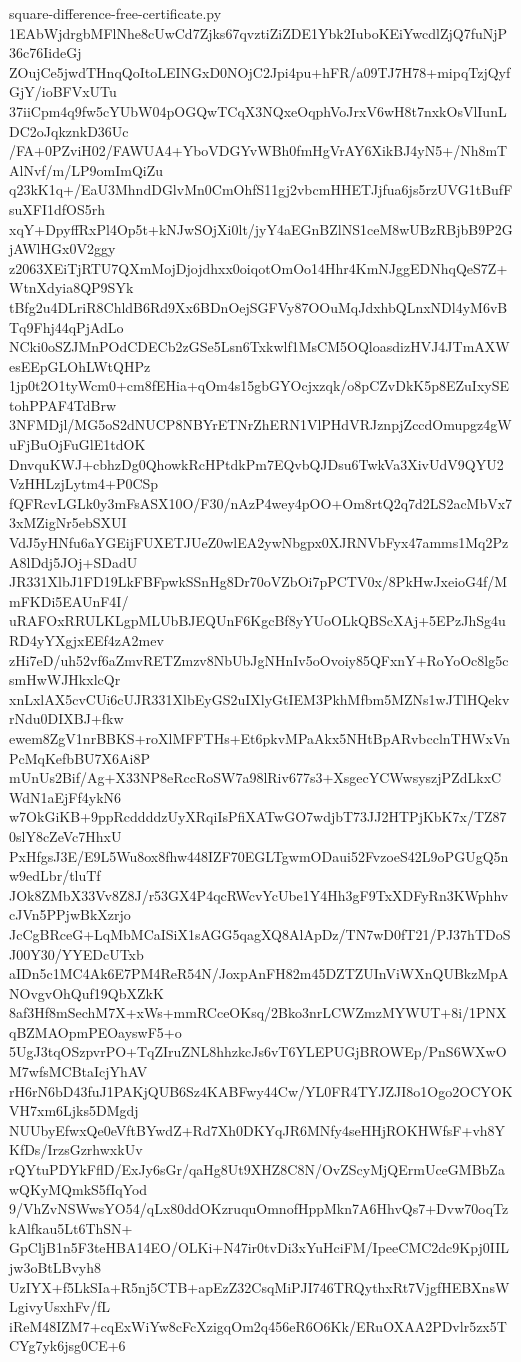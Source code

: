 \documentclass[11pt]{article}
\theoremstyle{definition}
\theoremstyle{remark}
\begin{document}
\begin{filecontents*}[overwrite]{square-difference-free-certificate.py}
1EAbWjdrgbMFlNhe8cUwCd7Zjks67qvztiZiZDE1Ybk2IuboKEiYwcdlZjQ7fuNjP36c76IideGj
ZOujCe5jwdTHnqQoItoLEINGxD0NOjC2Jpi4pu+hFR/a09TJ7H78+mipqTzjQyfGjY/ioBFVxUTu
37iiCpm4q9fw5cYUbW04pOGQwTCqX3NQxeOqphVoJrxV6wH8t7nxkOsVlIunLDC2oJqkznkD36Uc
/FA+0PZviH02/FAWUA4+YboVDGYvWBh0fmHgVrAY6XikBJ4yN5+/Nh8mTAlNvf/m/LP9omImQiZu
q23kK1q+/EaU3MhndDGlvMn0CmOhfS11gj2vbcmHHETJjfua6js5rzUVG1tBufFsuXFI1dfOS5rh
xqY+DpyffRxPl4Op5t+kNJwSOjXi0lt/jyY4aEGnBZlNS1ceM8wUBzRBjbB9P2GjAWlHGx0V2ggy
z2063XEiTjRTU7QXmMojDjojdhxx0oiqotOmOo14Hhr4KmNJggEDNhqQeS7Z+WtnXdyia8QP9SYk
tBfg2u4DLriR8ChldB6Rd9Xx6BDnOejSGFVy87OOuMqJdxhbQLnxNDl4yM6vBTq9Fhj44qPjAdLo
NCki0oSZJMnPOdCDECb2zGSe5Lsn6Txkwlf1MsCM5OQloasdizHVJ4JTmAXWesEEpGLOhLWtQHPz
1jp0t2O1tyWcm0+cm8fEHia+qOm4s15gbGYOcjxzqk/o8pCZvDkK5p8EZuIxySEtohPPAF4TdBrw
3NFMDjl/MG5oS2dNUCP8NBYrETNrZhERN1VlPHdVRJznpjZccdOmupgz4gWuFjBuOjFuGlE1tdOK
DnvquKWJ+cbhzDg0QhowkRcHPtdkPm7EQvbQJDsu6TwkVa3XivUdV9QYU2VzHHLzjLytm4+P0CSp
fQFRcvLGLk0y3mFsASX10O/F30/nAzP4wey4pOO+Om8rtQ2q7d2LS2acMbVx73xMZigNr5ebSXUI
VdJ5yHNfu6aYGEijFUXETJUeZ0wlEA2ywNbgpx0XJRNVbFyx47amms1Mq2PzA8lDdj5JOj+SDadU
JR331XlbJ1FD19LkFBFpwkSSnHg8Dr70oVZbOi7pPCTV0x/8PkHwJxeioG4f/MmFKDi5EAUnF4I/
uRAFOxRRULKLgpMLUbBJEQUnF6KgcBf8yYUoOLkQBScXAj+5EPzJhSg4uRD4yYXgjxEEf4zA2mev
zHi7eD/uh52vf6aZmvRETZmzv8NbUbJgNHnIv5oOvoiy85QFxnY+RoYoOc8lg5csmHwWJHkxlcQr
xnLxlAX5cvCUi6cUJR331XlbEyGS2uIXlyGtIEM3PkhMfbm5MZNs1wJTlHQekvrNdu0DIXBJ+fkw
ewem8ZgV1nrBBKS+roXlMFFTHs+Et6pkvMPaAkx5NHtBpARvbcclnTHWxVnPcMqKefbBU7X6Ai8P
mUnUs2Bif/Ag+X33NP8eRccRoSW7a98lRiv677s3+XsgecYCWwsyszjPZdLkxCWdN1aEjFf4ykN6
w7OkGiKB+9ppRcddddzUyXRqiIsPfiXATwGO7wdjbT73JJ2HTPjKbK7x/TZ870slY8cZeVc7HhxU
PxHfgsJ3E/E9L5Wu8ox8fhw448IZF70EGLTgwmODaui52FvzoeS42L9oPGUgQ5nw9edLbr/tluTf
JOk8ZMbX33Vv8Z8J/r53GX4P4qcRWcvYcUbe1Y4Hh3gF9TxXDFyRn3KWphhvcJVn5PPjwBkXzrjo
JcCgBRceG+LqMbMCaISiX1sAGG5qagXQ8AlApDz/TN7wD0fT21/PJ37hTDoSJ00Y30/YYEDcUTxb
aIDn5c1MC4Ak6E7PM4ReR54N/JoxpAnFH82m45DZTZUInViWXnQUBkzMpANOvgvOhQuf19QbXZkK
8af3Hf8mSechM7X+xWs+mmRCceOKsq/2Bko3nrLCWZmzMYWUT+8i/1PNXqBZMAOpmPEOayswF5+o
5UgJ3tqOSzpvrPO+TqZIruZNL8hhzkcJs6vT6YLEPUGjBROWEp/PnS6WXwOM7wfsMCBtaIcjYhAV
rH6rN6bD43fuJ1PAKjQUB6Sz4KABFwy44Cw/YL0FR4TYJZJI8o1Ogo2OCYOKVH7xm6Ljks5DMgdj
NUUbyEfwxQe0eVftBYwdZ+Rd7Xh0DKYqJR6MNfy4seHHjROKHWfsF+vh8YKfDs/IrzsGzrhwxkUv
rQYtuPDYkFflD/ExJy6sGr/qaHg8Ut9XHZ8C8N/OvZScyMjQErmUceGMBbZawQKyMQmkS5fIqYod
9/VhZvNSWwsYO54/qLx80ddOKzruquOmnofHppMkn7A6HhvQs7+Dvw70oqTzkAlfkau5Lt6ThSN+
GpCljB1n5F3teHBA14EO/OLKi+N47ir0tvDi3xYuHciFM/IpeeCMC2dc9Kpj0IILjw3oBtLBvyh8
UzIYX+f5LkSIa+R5nj5CTB+apEzZ32CsqMiPJI746TRQythxRt7VjgfHEBXnsWLgivyUsxhFv/fL
iReM48IZM7+cqExWiYw8cFcXzigqOm2q456eR6O6Kk/ERuOXAA2PDvlr5zx5TCYg7yk6jsg0CE+6

\end{filecontents*}
\end{document}
